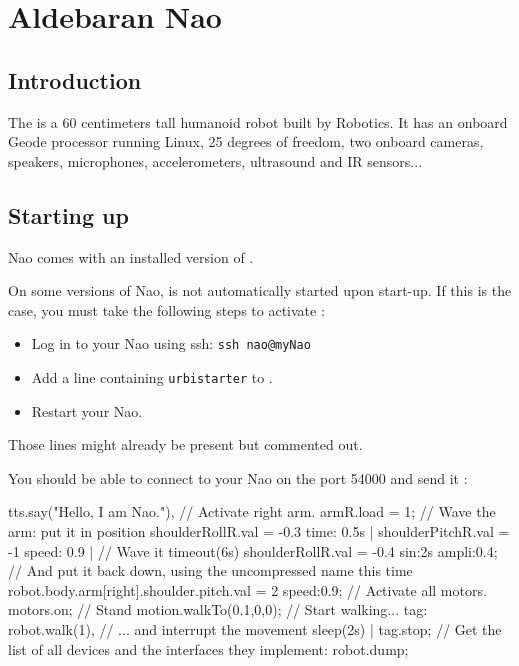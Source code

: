 
\newcommand{\naoqi}{NaoQi\xspace}

\chapter{Aldebaran Nao}
\label{sec:nao}

\section{Introduction}

The  is a 60 centimeters tall humanoid robot built by
 Robotics.  It has an onboard Geode processor running
Linux, 25 degrees of freedom, two onboard cameras, speakers,
microphones, accelerometers, ultrasound and IR sensors...

\section{Starting up}

Nao comes with an installed version of \urbi.

On some versions of Nao, \urbi is not automatically started upon start-up.
If this is the case, you must take the following steps to activate \urbi:

\begin{itemize}
\item Log in to your Nao using ssh: \lstinline|ssh nao@myNao|
\item Add a line containing \lstinline|urbistarter| to
  .
\item Restart your Nao.
\end{itemize}

Those lines might already be present but commented out.

You should be able to connect to your Nao on the port 54000 and send it \us:

\begin{urbiunchecked}
tts.say("Hello, I am Nao."),
// Activate right arm.
armR.load = 1;
// Wave the arm: put it in position
shoulderRollR.val = -0.3 time: 0.5s |
shoulderPitchR.val = -1 speed: 0.9 |
// Wave it
timeout(6s) shoulderRollR.val = -0.4 sin:2s ampli:0.4;
// And put it back down, using the uncompressed name this time
robot.body.arm[right].shoulder.pitch.val = 2 speed:0.9;
// Activate all motors.
motors.on;
// Stand
motion.walkTo(0.1,0,0);
// Start walking...
tag: robot.walk(1),
// ... and interrupt the movement
sleep(2s) | tag.stop;
// Get the list of all devices and the interfaces they implement:
robot.dump;
\end{urbiunchecked}

